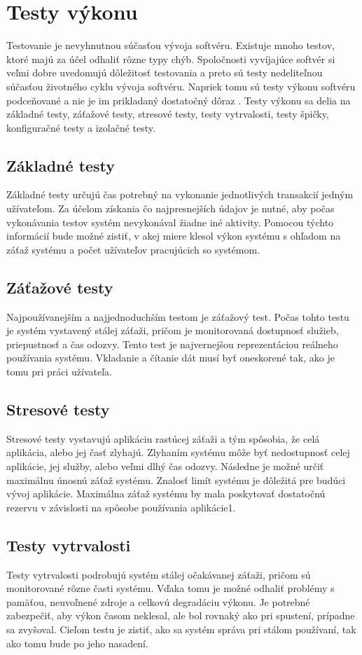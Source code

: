 \documentclass[12pt,oneside,final]{fithesis-utf8}
\begin{document}
\chapter{Testy výkonu}

Testovanie je nevyhnutnou súčasťou vývoja softvéru. Existuje mnoho testov, ktoré majú za účel odhaliť rôzne typy chýb. Spoločnosti vyvíjajúce softvér si veľmi dobre uvedomujú dôležitosť testovania a preto sú testy nedeliteľnou súčasťou životného cyklu vývoja softvéru. Napriek tomu sú testy výkonu softvéru podceňované a nie je im prikladaný dostatočný dôraz \cite{Art}.
Testy výkonu sa delia na základné testy, záťažové testy,  stresové testy, testy vytrvalosti, testy špičky, konfiguračné testy a izolačné testy.

\section{Základné testy}
Základné testy určujú čas potrebný na vykonanie jednotlivých transakcií jedným užívateľom. Za účelom získania čo najpresnejších údajov je nutné, aby počas vykonávania testov systém nevykonával žiadne iné aktivity. Pomocou týchto informácií bude možné zistiť, v akej miere klesol výkon systému s ohľadom na záťaž systému a počet užívateľov pracujúcich so systémom.

\section{Záťažové testy}
Najpoužívanejším a najjednoduchším testom je záťažový test. Počas tohto testu je systém vystavený stálej záťaži, pričom je monitorovaná dostupnosť služieb, priepustnosť a čas odozvy. Tento test je najvernejšou reprezentáciou reálneho používania systému. Vkladanie a čítanie dát musí byť oneskorené tak, ako je tomu pri práci užívateľa.

\section{Stresové testy}
Stresové testy vystavujú aplikáciu rastúcej záťaži a tým spôsobia, že celá aplikácia, alebo jej časť zlyhajú. Zlyhaním systému môže byť nedostupnosť celej aplikácie, jej služby, alebo veľmi dlhý čas odozvy. Následne je možné určiť maximálnu únosnú záťaž systému. Znalosť limít systému je dôležitá pre budúci vývoj aplikácie. Maximálna záťaž systému by mala poskytovať dostatočnú rezervu v závislosti na spôsobe používania aplikácie1. 

\section{Testy vytrvalosti}
Testy vytrvalosti podrobujú systém stálej očakávanej záťaži, pričom sú monitorované rôzne časti systému. Vďaka tomu je možné odhaliť problémy s pamäťou, neuvoľnené zdroje a celkovú degradáciu výkonu. Je potrebné zabezpečiť, aby výkon časom neklesal, ale bol rovnaký ako pri spustení, prípadne sa zvyšoval. Cieľom testu je zistiť, ako sa systém správa pri stálom používaní, tak ako tomu bude po jeho nasadení. 
\end{document}
